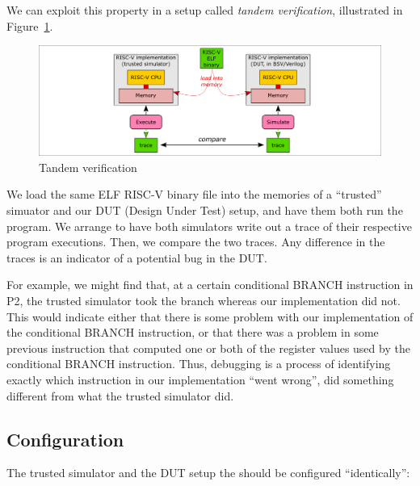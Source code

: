 We can exploit this property in a setup called \emph{tandem
verification}, illustrated in Figure~\ref{Fig_tandem_verification}.
\begin{figure}[htbp]
  \centerline{\includegraphics[width=6in,angle=0]{Figures/Fig_tandem_verification}}
  \caption{\label{Fig_tandem_verification}
                  Tandem verification}
\end{figure}

We load the same ELF RISC-V binary file into the memories of a
``trusted'' simuator and our DUT (Design Under Test) setup, and have
them both run the program.  We arrange to have both simulators write
out a trace of their respective program executions.  Then, we compare
the two traces. Any difference in the traces is an indicator of a
potential bug in the DUT.

For example, we might find that, at a certain conditional BRANCH
instruction in P2, the trusted simulator took the branch whereas our
implementation did not.  This would indicate either that there is some
problem with our implementation of the conditional BRANCH instruction,
or that there was a problem in some previous instruction that computed
one or both of the register values used by the conditional BRANCH
instruction.  Thus, debugging is a process of identifying exactly
which instruction in our implementation ``went wrong'', {\ie} did
something different from what the trusted simulator did.


\subsection{Configuration}

The trusted simulator and the DUT setup the should be configured
``identically'':

